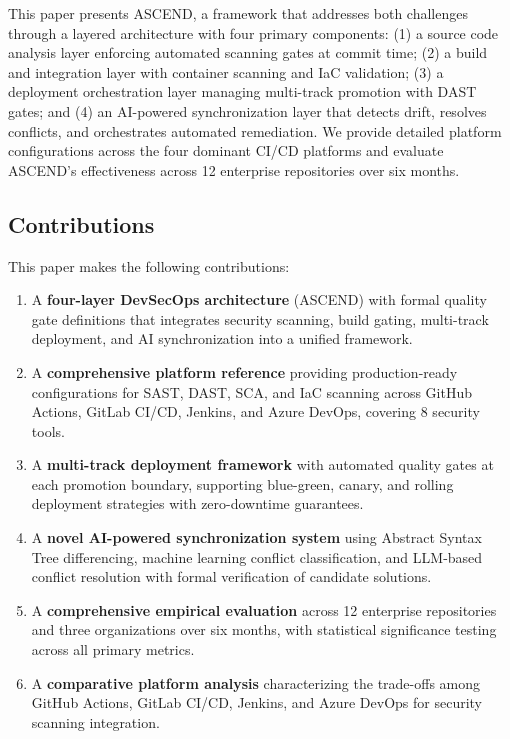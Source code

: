 \documentclass[journal]{IEEEtran}
\begin{document}
This paper presents ASCEND, a framework that addresses both challenges through a layered architecture with four primary components: (1) a source code analysis layer enforcing automated scanning gates at commit time; (2) a build and integration layer with container scanning and IaC validation; (3) a deployment orchestration layer managing multi-track promotion with DAST gates; and (4) an AI-powered synchronization layer that detects drift, resolves conflicts, and orchestrates automated remediation. We provide detailed platform configurations across the four dominant CI/CD platforms and evaluate ASCEND's effectiveness across 12 enterprise repositories over six months.

\subsection{Contributions}

This paper makes the following contributions:

\begin{enumerate}
\item A \textbf{four-layer DevSecOps architecture} (ASCEND) with formal quality gate definitions that integrates security scanning, build gating, multi-track deployment, and AI synchronization into a unified framework.
\item A \textbf{comprehensive platform reference} providing production-ready configurations for SAST, DAST, SCA, and IaC scanning across GitHub Actions, GitLab CI/CD, Jenkins, and Azure DevOps, covering 8 security tools.
\item A \textbf{multi-track deployment framework} with automated quality gates at each promotion boundary, supporting blue-green, canary, and rolling deployment strategies with zero-downtime guarantees.
\item A \textbf{novel AI-powered synchronization system} using Abstract Syntax Tree differencing, machine learning conflict classification, and LLM-based conflict resolution with formal verification of candidate solutions.
\item A \textbf{comprehensive empirical evaluation} across 12 enterprise repositories and three organizations over six months, with statistical significance testing across all primary metrics.
\item A \textbf{comparative platform analysis} characterizing the trade-offs among GitHub Actions, GitLab CI/CD, Jenkins, and Azure DevOps for security scanning integration.
\end{enumerate}
\end{document}
